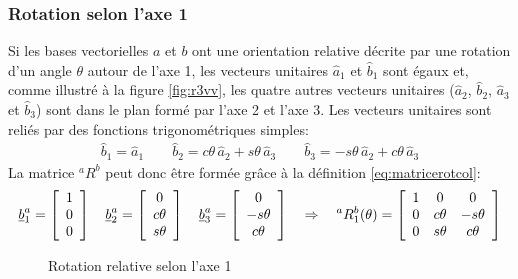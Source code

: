 \subsubsection{Rotation selon l'axe 1}
%
Si les bases vectorielles $a$ et $b$ ont une orientation relative décrite par une rotation d'un angle $\theta$ autour de l'axe 1, les vecteurs unitaires $\hat{a}_1$ et $\hat{b}_1$ sont égaux et, comme illustré à la figure \ref{fig:r3vv}, les quatre autres vecteurs unitaires ($\hat{a}_2$, $\hat{b}_2$, $\hat{a}_3$ et $\hat{b}_3$) sont dans le plan formé par l'axe 2 et l'axe 3. Les vecteurs unitaires sont reliés par des fonctions trigonométriques simples: 
\begin{align}
\hat{b}_1 = \hat{a}_1 \quad\quad
\hat{b}_2 = c\theta \, \hat{a}_2 + s\theta \, \hat{a}_3 \quad\quad
\hat{b}_3 = -s\theta \, \hat{a}_2 + c\theta \, \hat{a}_3
\label{eq:rot1vecuni}
\end{align}
La matrice $^aR^b$ peut donc être formée grâce à la définition \eqref{eq:matricerotcol}:
\begin{align}
\underline{b}_1^a = \left[ \begin{array}{c} 1 \\ 0 \\ 0  \end{array} \right] \quad
\underline{b}_2^a = \left[ \begin{array}{c} 0 \\ c\theta \\ s\theta  \end{array} \right] \quad
\underline{b}_3^a = \left[ \begin{array}{c} 0 \\ -s\theta \\ c\theta  \end{array} \right]
\quad \Rightarrow \quad
^aR^b_1(\theta) 
= \left[ \begin{array}{c c c}
	1 & 0 & 0 \\
	0 & c\theta  & -s\theta \\
	0 & s\theta & c\theta 
\end{array}  \right]
\label{eq:rot1theta}
\end{align}
%
\begin{figure}[H]
        \centering
				\hspace{+20pt}
        \caption{Rotation relative selon l'axe 1}
				\label{fig:r1vv}
\end{figure}


